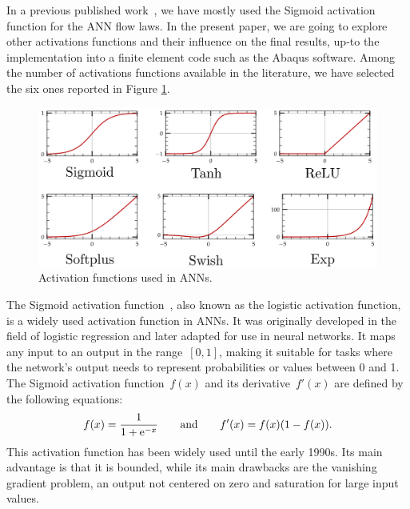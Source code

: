 \documentclass[algorithms,article,submit,pdftex,oneauthors]{Definitions/mdpi}
\DeclareRobustCommand{\e}[1]{{\rm e}^{#1}}
\begin{document}
In a previous published work~\cite{Pantale-2021-EIN, Pantale-2023-DIA}, we have mostly used the Sigmoid activation function for the ANN flow laws.
In the present paper, we are going to explore other activations functions and their influence on the final results, up-to the implementation into a finite element code such as the Abaqus software.
Among the number of activations functions available in the literature, we have selected the six ones reported in Figure \ref{fig:ActFunctions}.
\begin{figure}[h!]
\centering
\includegraphics[width=0.8\columnwidth]{Figures/ActFunctions}
\caption{Activation functions used in ANNs.}
\label{fig:ActFunctions}
\end{figure}

The Sigmoid activation function~\cite{Han-1995-ISF}, also known as the logistic activation function, is a widely used activation function in ANNs.
It was originally developed in the field of logistic regression and later adapted for use in neural networks.
It maps any input to an output in the range~$[0,1]$, making it suitable for tasks where the network's output needs to represent probabilities or values between 0 and 1.
The Sigmoid activation function~$f(x)$ and its derivative~$f'(x)$ are defined by the following equations:
\begin{equation}
f(x) = \frac{1}{1+\e{-x}}\qquad \text{and}\qquad f'(x) = f(x)\left(1-f(x)\right).\label{eq:act-sig}
\end{equation}
This activation function has been widely used until the early 1990s.
Its main advantage is that it is bounded, while its main drawbacks are the vanishing gradient problem, an output not centered on zero and saturation for large input values.
\end{document}
